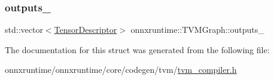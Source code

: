 \mbox{\label{structonnxruntime_1_1TVMGraph_a0e00c2efd0c8e1f53738f0b1293fe08a}} 
\subsubsection{\texorpdfstring{outputs\+\_\+}{outputs\_}}
{\footnotesize\ttfamily std\+::vector$<$\mbox{\hyperlink{structonnxruntime_1_1TVMGraph_1_1TensorDescriptor}{Tensor\+Descriptor}}$>$ onnxruntime\+::\+T\+V\+M\+Graph\+::outputs\+\_\+}



The documentation for this struct was generated from the following file\+:\begin{DoxyCompactItemize}
\item 
onnxruntime/onnxruntime/core/codegen/tvm/\mbox{\hyperlink{tvm__compiler_8h}{tvm\+\_\+compiler.\+h}}\end{DoxyCompactItemize}
